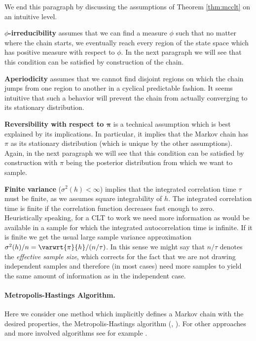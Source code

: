 \noindent
We end this paragraph by discussing the assumptions of Theorem \ref{thm:mcclt} on an intuitive level.

\textbf{$\phi$-irreducibility} assumes that we can find a measure $\phi$ such that no matter where the chain starts, we eventually reach every region of the state space which has positive measure with respect to $\phi$.
In the next paragraph we will see that this condition can be satisfied by construction of the chain.

\textbf{Aperiodicity} assumes that we cannot find disjoint regions on which the chain jumps from one region to another in a cyclical predictable fashion.
It seems intuitive that such a behavior will prevent the chain from actually converging to its stationary distribution.

\textbf{Reversibility with respect to $\bm{\pi}$} is a technical assumption which is best explained by its implications.
In particular, it implies that the Markov chain has $\pi$ as its stationary distribution (which is unique by the other assumptions).
Again, in the next paragraph we will see that this condition can be satisfied by construction with $\pi$ being the posterior distribution from which we want to sample.

\textbf{Finite variance} ($\sigma^2(h) < \infty$) implies that the integrated correlation time $\tau$ must be finite, as we assumes square integrability of $h$.
The integrated correlation time is finite if the correlation function decreases fast enough to zero.
Heuristically speaking, for a CLT to work we need more information as would be available in a sample for which the integrated autocorrelation time is infinite.
If it is finite we get the usual large sample variance approximation $\sigma^2(h) / n = \varwrt{\pi}{h} / (n/\tau)$.
In this sense we might say that $n/\tau$ denotes the \emph{effective sample size}, which corrects for the fact that we are not drawing independent samples and therefore (in most cases) need more samples to yield the same amount of information as in the independent case.

\paragraph{Metropolis-Hastings Algorithm.}
Here we consider one method which implicitly defines a Markov chain with the desired properties, the Metropolis-Hastings algorithm (\citet{Metropolis1953}, \citet{hastings70}).
For other approaches and more involved algorithms see for example \citet{liang10}.

